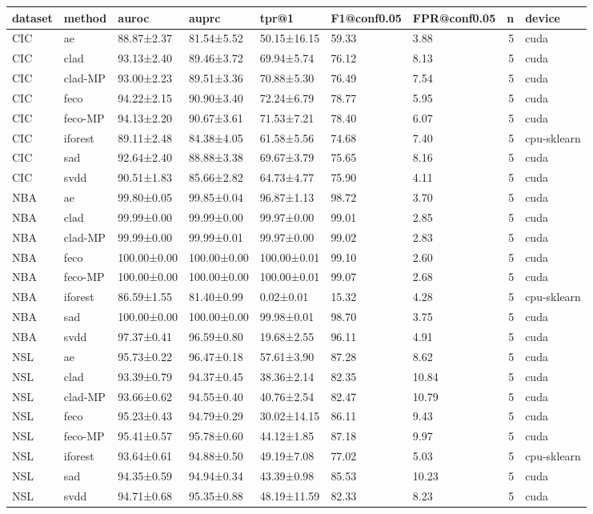 \begin{tabular}{lllllllrl}
\toprule
dataset & method & auroc & auprc & tpr@1 & F1@conf0.05 & FPR@conf0.05 & n & device \\
\midrule
CIC & ae & 88.87±2.37 & 81.54±5.52 & 50.15±16.15 & 59.33 & 3.88 & 5 & cuda \\
CIC & clad & 93.13±2.40 & 89.46±3.72 & 69.94±5.74 & 76.12 & 8.13 & 5 & cuda \\
CIC & clad-MP & 93.00±2.23 & 89.51±3.36 & 70.88±5.30 & 76.49 & 7.54 & 5 & cuda \\
CIC & feco & 94.22±2.15 & 90.90±3.40 & 72.24±6.79 & 78.77 & 5.95 & 5 & cuda \\
CIC & feco-MP & 94.13±2.20 & 90.67±3.61 & 71.53±7.21 & 78.40 & 6.07 & 5 & cuda \\
CIC & iforest & 89.11±2.48 & 84.38±4.05 & 61.58±5.56 & 74.68 & 7.40 & 5 & cpu-sklearn \\
CIC & sad & 92.64±2.40 & 88.88±3.38 & 69.67±3.79 & 75.65 & 8.16 & 5 & cuda \\
CIC & svdd & 90.51±1.83 & 85.66±2.82 & 64.73±4.77 & 75.90 & 4.11 & 5 & cuda \\
NBA & ae & 99.80±0.05 & 99.85±0.04 & 96.87±1.13 & 98.72 & 3.70 & 5 & cuda \\
NBA & clad & 99.99±0.00 & 99.99±0.00 & 99.97±0.00 & 99.01 & 2.85 & 5 & cuda \\
NBA & clad-MP & 99.99±0.00 & 99.99±0.01 & 99.97±0.00 & 99.02 & 2.83 & 5 & cuda \\
NBA & feco & 100.00±0.00 & 100.00±0.00 & 100.00±0.01 & 99.10 & 2.60 & 5 & cuda \\
NBA & feco-MP & 100.00±0.00 & 100.00±0.00 & 100.00±0.01 & 99.07 & 2.68 & 5 & cuda \\
NBA & iforest & 86.59±1.55 & 81.40±0.99 & 0.02±0.01 & 15.32 & 4.28 & 5 & cpu-sklearn \\
NBA & sad & 100.00±0.00 & 100.00±0.00 & 99.98±0.01 & 98.70 & 3.75 & 5 & cuda \\
NBA & svdd & 97.37±0.41 & 96.59±0.80 & 19.68±2.55 & 96.11 & 4.91 & 5 & cuda \\
NSL & ae & 95.73±0.22 & 96.47±0.18 & 57.61±3.90 & 87.28 & 8.62 & 5 & cuda \\
NSL & clad & 93.39±0.79 & 94.37±0.45 & 38.36±2.14 & 82.35 & 10.84 & 5 & cuda \\
NSL & clad-MP & 93.66±0.62 & 94.55±0.40 & 40.76±2.54 & 82.47 & 10.79 & 5 & cuda \\
NSL & feco & 95.23±0.43 & 94.79±0.29 & 30.02±14.15 & 86.11 & 9.43 & 5 & cuda \\
NSL & feco-MP & 95.41±0.57 & 95.78±0.60 & 44.12±1.85 & 87.18 & 9.97 & 5 & cuda \\
NSL & iforest & 93.64±0.61 & 94.88±0.50 & 49.19±7.08 & 77.02 & 5.03 & 5 & cpu-sklearn \\
NSL & sad & 94.35±0.59 & 94.94±0.34 & 43.39±0.98 & 85.53 & 10.23 & 5 & cuda \\
NSL & svdd & 94.71±0.68 & 95.35±0.88 & 48.19±11.59 & 82.33 & 8.23 & 5 & cuda \\
\bottomrule
\end{tabular}
